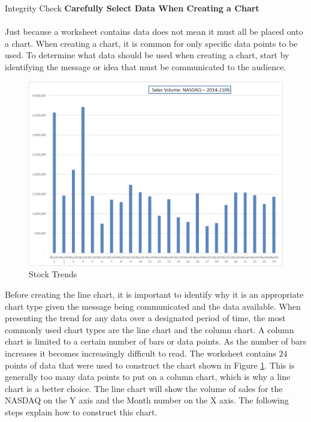 \begin{center}
	\begin{infobox}{Integrity Check}
		\textbf{Carefully Select Data When Creating a Chart}
		\\
		\\
		Just because a worksheet contains data does not mean it must all be placed onto a chart. When creating a chart, it is common for only specific data points to be used. To determine what data should be used when creating a chart, start by identifying the message or idea that must be communicated to the audience.
	\end{infobox}
\end{center}

\begin{figure}[H]
	\centering
	\includegraphics[width=\maxwidth{.95\linewidth}]{gfx/ch04_fig01}
	\caption{Stock Trends}
	\label{04:fig01}
\end{figure}

Before creating the line chart, it is important to identify why it is an appropriate chart type given the message being communicated and the data available. When presenting the trend for any data over a designated period of time, the most commonly used chart types are the line chart and the column chart. A column chart is limited to a certain number of bars or data points. As the number of bars increases it becomes increasingly difficult to read. The worksheet contains $ 24 $ points of data that were used to construct the chart shown in Figure \ref{04:fig01}. This is generally too many data points to put on a column chart, which is why a line chart is a better choice. The line chart will show the volume of sales for the NASDAQ on the Y axis and the Month number on the X axis. The following steps explain how to construct this chart.

